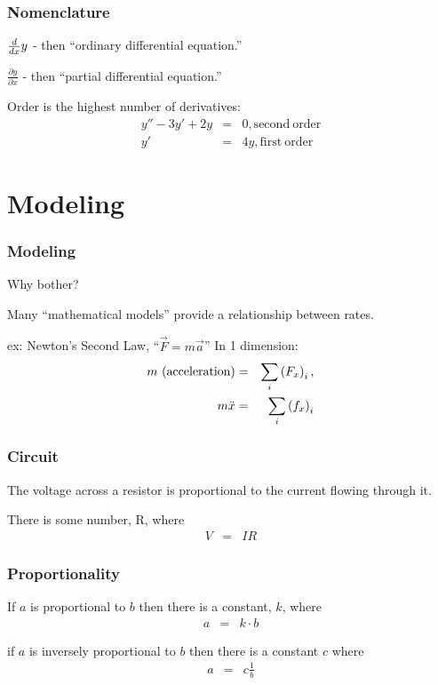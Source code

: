 \begin{frame}
  \frametitle{Nomenclature}
  
  \vfill

  $\deriv{y}{x}$ - then ``ordinary differential equation.''

  \vfill

  $\frac{\partial y}{\partial x}$ - then ``partial differential
  equation.''

  \vfill

  Order is the highest number of derivatives:
  \begin{eqnarray*}
    y'' - 3 y' + 2y & = & 0, \mathrm{second~order} \\
    y'  & = & 4y, \mathrm{first~order} 
  \end{eqnarray*}

  \vfill


\end{frame}

\section{Modeling}


\begin{frame}
  \frametitle{Modeling}

  Why bother?

  Many ``mathematical models'' provide a relationship between rates.

  ex: Newton's Second Law, ``$\vec{F} = m \vec{a}$'' In 1 dimension:
  \begin{eqnarray*}
    m\mathrm{~(acceleration)} & = & \sum_i \lp F_x \rp_i, \\
    m \ddot{x} & = & \sum_i \lp f_x \rp_i
  \end{eqnarray*}

  
\end{frame}


\begin{frame}
  \frametitle{Circuit}
  
  The voltage across a resistor is proportional to the current flowing
  through it.

  There is some number, R, where
  \begin{eqnarray*}
    V & = & IR
  \end{eqnarray*}
\end{frame}

\begin{frame}
  \frametitle{Proportionality}
  
  If $a$ is proportional to $b$ then there is a constant, $k$, where 
  \begin{eqnarray*}
    a  & = & k \cdot b
  \end{eqnarray*}

  if $a$ is inversely proportional to $b$ then there is a constant $c$
  where 
  \begin{eqnarray*}
    a & = & c \frac{1}{b}
  \end{eqnarray*}
\end{frame}


